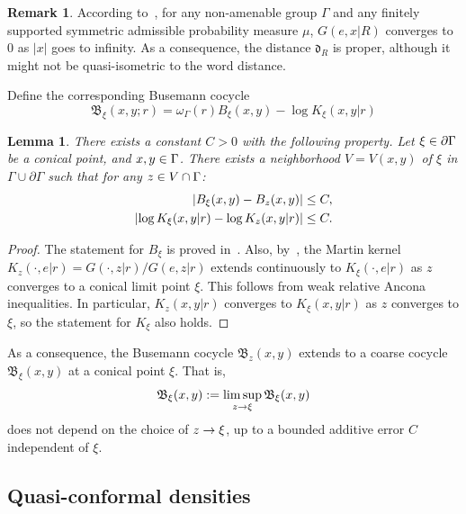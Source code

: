 \documentclass[10pt]{amsart}
\newtheorem{lemm}[theo]{Lemma}\newtheorem{prop}[theo]{Proposition}\newtheorem{coro}[theo]{Corollary}\newtheorem{conj}[theo]{Conjecture}
\theoremstyle{definition}\newtheorem{defi}[theo]{Definition}\newtheorem{rema}[theo]{Remark}\newtheorem{exam}[theo]{Example}\newtheorem{exem}[theo]{Example}\newtheorem{nota}[theo]{Notation}
\newcommand{\pG}{\partial{\Gamma}}
\newcommand{\fkd}{\mathfrak{d}}
\newcommand{\fkB}{\mathfrak{B}}
\let\originalleft\left
\let\originalright\right
\renewcommand{\left}{\mathopen{}\mathclose\bgroup\originalleft}
\renewcommand{\right}{\aftergroup\egroup\originalright}
\let\oldin\in
\renewcommand{\in}{\mathchoice{\oldin}{\oldin}{\,\oldin\,}{\,\oldin\,}}
\let\oldle\le
\renewcommand{\le}{\mathchoice{\oldle}{\oldle}{\,\oldle\,}{\,\oldle\,}}
\renewcommand*{\to}{\mathchoice{\longrightarrow}{\rightarrow}{\rightarrow}{\rightarrow}}
\begin{document}
\begin{rema}
According to~\cite[Lemma~2.1]{GouezelLalley}, for any non-amenable group $\Gamma$ and any finitely supported symmetric admissible probability measure $\mu$, $G(e,x|R)$ converges to 0 as $|x|$ goes to infinity. As a consequence, the distance $\fkd_R$ is proper, although it might not be quasi-isometric to the word distance.
\end{rema}

Define the corresponding Busemann cocycle
\begin{equation}\label{defBusemann}
\fkB_\xi(x, y;r) = \omega_\Gamma(r)B_\xi(x, y)-\log K_\xi(x,y|r)
\end{equation}



\begin{lemm}\label{BusemanEstLem}
There exists a constant $C>0$ with the following property. Let $\xi \in \pG$ be a conical point, and $x, y \in \Gamma$. There exists a neighborhood $V=V(x,y)$ of $\xi$ in $\Gamma\cup\pG$ such that for any $ z \in V \cap \Gamma$:
\begin{align*}
\left\lvert B_\xi(x, y)-B_z(x, y)\right| &\le C, \\
\left\lvert \log K_{\xi}(x, y|r)-\log K_{z}(x, y|r)\right| &\le C.
\end{align*}
\end{lemm}

\begin{proof}
The statement for $B_\xi$ is proved in~\cite[Lemma~2.20]{YangPS}. Also, by~\cite[Proposition~4.1]{DG21}, the Martin kernel $K_z(\cdot,e|r)=G(\cdot, z|r)/G(e, z|r)$ extends continuously to $K_\xi(\cdot,e|r)$ as $z$ converges to a conical limit point $\xi$. This follows from weak relative Ancona inequalities. In particular, $K_z(x,y|r)$ converges to $K_\xi(x,y|r)$ as $z$ converges to $\xi$, so the statement for $K_\xi$ also holds.
\end{proof}

As a consequence, the Busemann cocycle $\fkB_z(x,y)$ extends to a coarse cocycle $\fkB_\xi(x,y)$ at a conical point $\xi$. That is,
\[
\fkB_\xi(x,y) := \limsup_{z\to \xi} \fkB_\xi(x,y)
\]
does not depend on the choice of $z\to \xi$, up to a bounded additive error $C$ independent of $\xi$.

\subsection{Quasi-conformal densities}
\end{document}
